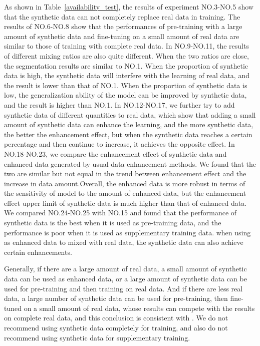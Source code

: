 \documentclass[letterpaper]{article} %
\begin{document}
As shown in Table~\ref{availability_test}, the results of experiment NO.3-NO.5 show that the synthetic data can not completely replace real data in training.           
The results of NO.6-NO.8 show that the performances of pre-training with a large amount of synthetic data and fine-tuning on a small amount of real data are similar to those of training with complete real data.  
In NO.9-NO.11, the results of different mixing ratios are also quite different. When the two ratios are close, the segmentation results are similar to NO.1. When the proportion of synthetic data is high, the synthetic data will interfere with the learning of real data, and the result is lower than that of NO.1. When the proportion of synthetic data is low, the generalization ability of the model can be improved by synthetic data, and the result is higher than NO.1.           
In NO.12-NO.17, we further try to add synthetic data of different quantities to real data, which show that adding a small amount of synthetic data can enhance the learning, and the more synthetic data, the better the enhancement effect, but when the synthetic data reaches a certain percentage and then continue to increase, it achieves the opposite effect. 
In NO.18-NO.23, we compare the enhancement effect of synthetic data and enhanced data generated by usual data enhancement methods. We found that the two are similar but not equal in the trend between  enhancement effect and the increase in data amount.Overall, the enhanced data is more robust in terms of the sensitivity of model to the amount of enhanced data, but the enhancement effect upper limit of synthetic data is much higher than that of enhanced data.  
We compared NO.24-NO.25 with NO.15 and found that the performance of synthetic data is the best when it is used as pre-training data, and the performance is poor when it is used as supplementary training data. when using as enhanced data to mixed with real data, the synthetic data can also achieve certain enhancements.

Generally, if there are a large amount of real data, a small amount of synthetic data can be used as enhanced data, or a large amount of synthetic data can be used for pre-training and then training on real data. And if there are less real data, a large number of synthetic data can be used for pre-training, then fine-tuned on a small amount of real data, whose results can compete with the results on complete real data, and this conclusion is consistent with \cite{4shin2018medical}. We do not recommend using synthetic data completely for training, and also do not recommend using synthetic data for supplementary training.
\end{document}
